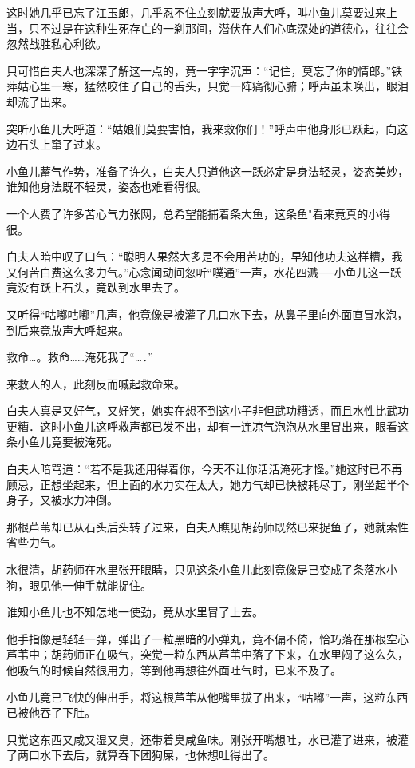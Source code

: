 \documentclass[12pt,oneside]{book}
\begin{document}
这时她几乎已忘了江玉郎，几乎忍不住立刻就要放声大呼，叫小鱼儿莫要过来上当，只不过是在这种生死存亡的一刹那间，潜伏在人们心底深处的道德心，往往会忽然战胜私心利欲。

只可惜白夫人也深深了解这一点的，竟一字字沉声：``记住，莫忘了你的情郎。''铁萍姑心里一寒，猛然咬住了自己的舌头，只觉一阵痛彻心腑；呼声虽未唤出，眼泪却流了出来。

突听小鱼儿大呼道：``姑娘们莫要害怕，我来救你们！''呼声中他身形已跃起，向这边石头上窜了过来。

小鱼儿蓄气作势，准备了许久，白夫人只道他这一跃必定是身法轻灵，姿态美妙，谁知他身法既不轻灵，姿态也难看得很。

一个人费了许多苦心气力张网，总希望能捕着条大鱼，这条鱼"看来竟真的小得很。

白夫人暗中叹了口气：``聪明人果然大多是不会用苦功的，早知他功夫这样糟，我又何苦白费这么多力气。''心念闻动间忽听``噗通''一声，水花四溅──小鱼儿这一跃竟没有跃上石头，竟跌到水里去了。

又听得``咕嘟咕嘟''几声，他竟像是被灌了几口水下去，从鼻子里向外面直冒水泡，到后来竟放声大呼起来。

救命\ldots。救命\ldots\ldots 淹死我了``\ldots．''

来救人的人，此刻反而喊起救命来。

白夫人真是又好气，又好笑，她实在想不到这小子非但武功糟透，而且水性比武功更糟．这时小鱼儿这呼救声都已发不出，却有一连凉气泡泡从水里冒出来，眼看这条小鱼儿竟要被淹死。

白夫人暗骂道：``若不是我还用得着你，今天不让你活活淹死才怪。''她这时已不再顾忌，正想坐起来，但上面的水力实在太大，她力气却已快被耗尽丁，刚坐起半个身子，又被水力冲倒。

那根芦苇却已从石头后头转了过来，白夫人瞧见胡药师既然已来捉鱼了，她就索性省些力气。

水很清，胡药师在水里张开眼睛，只见这条小鱼儿此刻竟像是已变成了条落水小狗，眼见他一伸手就能捉住。

谁知小鱼儿也不知怎地一使劲，竟从水里冒了上去。

他手指像是轻轻一弹，弹出了一粒黑暗的小弹丸，竟不偏不倚，恰巧落在那根空心芦苇中；胡药师正在吸气，突觉一粒东西从芦苇中落了下来，在水里闷了这么久，他吸气的时候自然很用力，等到他再想往外面吐气时，已来不及了。

小鱼儿竟已飞快的伸出手，将这根芦苇从他嘴里拔了出来，``咕嘟''一声，这粒东西已被他吞了下肚。

只觉这东西又咸又湿又臭，还带着臭咸鱼味。刚张开嘴想吐，水已灌了进来，被灌了两口水下去后，就算吞下团狗屎，也休想吐得出了。
\end{document}
